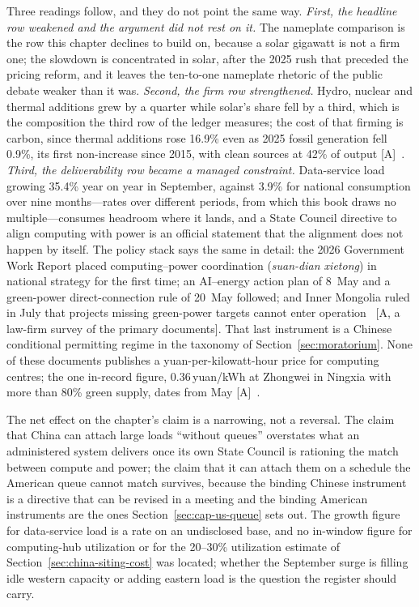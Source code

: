 Three readings follow, and they do not point the same way. \emph{First, the headline row weakened and the argument did not rest on it.} The nameplate comparison is the row this chapter declines to build on, because a solar gigawatt is not a firm one; the slowdown is concentrated in solar, after the 2025 rush that preceded the pricing reform, and it leaves the ten-to-one nameplate rhetoric of the public debate weaker than it was. \emph{Second, the firm row strengthened.} Hydro, nuclear and thermal additions grew by a quarter while solar's share fell by a third, which is the composition the third row of the ledger measures; the cost of that firming is carbon, since thermal additions rose 16.9\% even as 2025 fossil generation fell 0.9\%, its first non-increase since 2015, with clean sources at 42\% of output [A]~\cite{cap-ember-china}. \emph{Third, the deliverability row became a managed constraint.} Data-service load growing 35.4\% year on year in September, against 3.9\% for national consumption over nine months---rates over different periods, from which this book draws no multiple---consumes headroom where it lands, and a State Council directive to align computing with power is an official statement that the alignment does not happen by itself. The policy stack says the same in detail: the 2026 Government Work Report placed computing--power coordination (\emph{suan-dian xietong}) in national strategy for the first time; an AI--energy action plan of 8~May and a green-power direct-connection rule of 20~May followed; and Inner Mongolia ruled in July that projects missing green-power targets cannot enter operation~\cite{cap-china-policy-stack} [A, a law-firm survey of the primary documents]. That last instrument is a Chinese conditional permitting regime in the taxonomy of Section~\ref{sec:moratorium}. None of these documents publishes a yuan-per-kilowatt-hour price for computing centres; the one in-record figure, 0.36\,yuan/kWh at Zhongwei in Ningxia with more than 80\% green supply, dates from May [A]~\cite{cap-china-policy-stack}.

The net effect on the chapter's claim is a narrowing, not a reversal. The claim that China can attach large loads ``without queues'' overstates what an administered system delivers once its own State Council is rationing the match between compute and power; the claim that it can attach them on a schedule the American queue cannot match survives, because the binding Chinese instrument is a directive that can be revised in a meeting and the binding American instruments are the ones Section~\ref{sec:cap-us-queue} sets out. The growth figure for data-service load is a rate on an undisclosed base, and no in-window figure for computing-hub utilization or for the 20--30\% utilization estimate of Section~\ref{sec:china-siting-cost} was located; whether the September surge is filling idle western capacity or adding eastern load is the question the register should carry.

